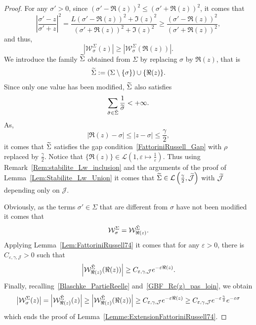 \documentclass[AHL,Unicode,longabstracts]{cedram}
\newcommand{\LL}{\mathcal{L}}
\let\oldtilde\tilde
\renewcommand*{\tilde}[1]{\mathchoice{\widetilde{#1}}{\widetilde{#1}}{\oldtilde{#1}}{\oldtilde{#1}}}\let\oldexists\exists
\renewcommand*{\exists}{\mathrel{\oldexists}}
\begin{document}
\begin{proof}
For any $\sigma'>0$, since $(\sigma' - \Re(z))^2 \leq (\sigma' + \Re(z))^2$, it comes that
\[
\left| \frac{\sigma' - z}{\sigma'+z} \right|^2 = \frac{L(\sigma' -\Re(z))^2 + \Im(z)^2}{(\sigma' + \Re(z))^2 + \Im(z)^2} \geq \frac{(\sigma'-\Re(z))^2}{(\sigma' + \Re(z))^2},
\]
and thus,
\begin{equation}\label{Blaschke_PartieReelle}
\left| \mathcal{W}^{\Sigma}_{\sigma}(z) \right| \geq \left| \mathcal{W}^{\Sigma}_{\sigma}(\Re(z)) \right|.
\end{equation}
We introduce the family $\tilde{\Sigma}$ obtained from $\Sigma$ by replacing $\sigma$ by $\Re(z)$, that is
\[
\tilde{\Sigma} :=\left(\Sigma \setminus\{\sigma\}\right)\cup \{\Re(z) \}.
\]
Since only one value has been modified, $\tilde{\Sigma}$ also satisfies
\[
\sum_{\tilde{\sigma} \in \tilde{\Sigma}} \frac{1}{\tilde{\sigma}} < +\infty.
\]
As,
\begin{equation}\label{GBF_Re(z)_pas_loin}
|\Re(z) - \sigma| \leq |z - \sigma| \leq \frac{\gamma}{2},
\end{equation}
it comes that $\tilde{\Sigma}$ satisfies the gap condition~\eqref{FattoriniRussell_Gap} with $\rho$ replaced by $\frac{\gamma}{2}$. Notice that $\{\Re(z) \} \in \LL \left(1, \varepsilon \mapsto \frac{1}{\varepsilon} \right)$. Thus using Remark~\ref{Rem:stabilite_Lw_inclusion} and the arguments of the proof of Lemma~\ref{Lem:Stabilite_Lw_Union} it comes that $\tilde{\Sigma}\in \mathcal{L}\left(\frac{\gamma}{2},\tilde{\mathcal{J}}\right)$ with $\tilde{\mathcal{J}}$ depending only on $\mathcal{J}$.


Obviously, as the terms $\sigma'\in \Sigma$ that are different from $\sigma$ have not been modified it comes that
\[
\mathcal{W}^{\Sigma}_{\sigma} = \mathcal{W}^{\tilde{\Sigma}}_{\Re(z)}.
\]
Applying Lemma~\ref{Lem:FattoriniRussell74} it comes that for any $\varepsilon>0$, there is $C_{\varepsilon, \gamma, \mathcal{J}}>0$ such that
\[
\left|\mathcal{W}^{\tilde{\Sigma}}_{\Re(z)}(\Re(z)) \right| \geq C_{\varepsilon, \gamma, \mathcal{J}} e^{-\varepsilon \Re(z)}.
\]
Finally, recalling~\eqref{Blaschke_PartieReelle} and~\eqref{GBF_Re(z)_pas_loin}, we obtain
\[
\left|\mathcal{W}^{\Sigma}_{\sigma}(z) \right| = \left|\mathcal{W}^{\tilde{\Sigma}}_{\Re(z)}(z) \right| \geq \left|\mathcal{W}^{\tilde{\Sigma}}_{\Re(z)}(\Re(z)) \right|
\geq C_{\varepsilon, \gamma, \mathcal{J}} e^{-\varepsilon \Re(z)}
\geq C_{\varepsilon, \gamma, \mathcal{J}} e^{-\varepsilon \frac{\gamma}{2}} e^{-\varepsilon \sigma}
\]
which ends the proof of Lemma~\ref{Lemme:ExtensionFattoriniRussell74}.
\end{proof}
\end{document}
